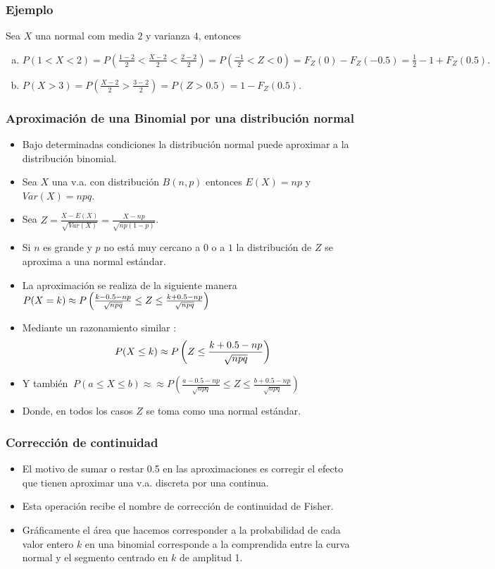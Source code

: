 \begin{frame}
\frametitle{Ejemplo}
Sea $X$ una normal com media $2$ y varianza $4$, entonces
    \begin{enumerate}[a)]
\item  $P(1< X< 2)= P(\frac{1-2}{2}<\frac{X-2}{2}<\frac{2-2}{2})=
    P(\frac{-1}{2}<Z<0)=F_{Z}(0)-F_{Z}(-0.5)=\frac{1}{2}-1+F_{Z}(0.5).$
    \item $P(X>3)=P(\frac{X-2}{2}>\frac{3-2}{2})=
    P(Z>0.5)=1-F_{Z}(0.5).$
    \end{enumerate}
\end{frame}


\begin{frame}
\frametitle{Aproximación de una Binomial por una distribución normal}
\begin{itemize}
\item  Bajo determinadas condiciones la distribución normal puede aproximar a la distribución binomial.
\item  Sea $X$ una v.a. con distribución $B(n,p)$ entonces $E(X)=np$  y $Var(X)=npq$.
\item Sea $Z=\frac{X-E(X)}{\sqrt{Var(X)}}=\frac{X-np}{\sqrt{np(1-p)}}$.
\item Si $n$ es grande y $p$ no está muy cercano a $0$ o a $1$ la distribución de $Z$ se aproxima a una normal estándar.
\item La aproximación se realiza de la siguiente manera
$P(X=k)\approx P\left({{k-0.5-np}\over \sqrt{npq}}\leq Z \leq {{k+0.5-np}\over
\sqrt{npq}}\right)$
\item Mediante un razonamiento similar : $$\ P(X\leq k)\approx P\left(Z \leq
{{k+0.5-np}\over \sqrt{npq}}\right)$$
\item Y también $\ P(a\leq X\leq b)\approx\approx P\left(\frac{a-0.5-np}{\sqrt{npq}}\leq Z \leq \frac{b+0.5-np}{\sqrt{npq}}\right)$
\item Donde, en todos los  casos $Z$ se toma como una normal estándar.
\end{itemize}
\end{frame}
\begin{frame}
\frametitle{Corrección de continuidad} 
\begin{itemize}
\item El motivo de sumar o restar 0.5 en las aproximaciones es
corregir el efecto que tienen aproximar una v.a. discreta por una continua.
\item Esta operación recibe el nombre de corrección de continuidad de Fisher. 
\item Gráficamente el área que hacemos
corresponder a la probabilidad de cada valor entero $k$ en una binomial corresponde a la
comprendida entre la curva normal y el  segmento centrado en $k$ de amplitud 1.
\end{itemize}
\end{frame}

